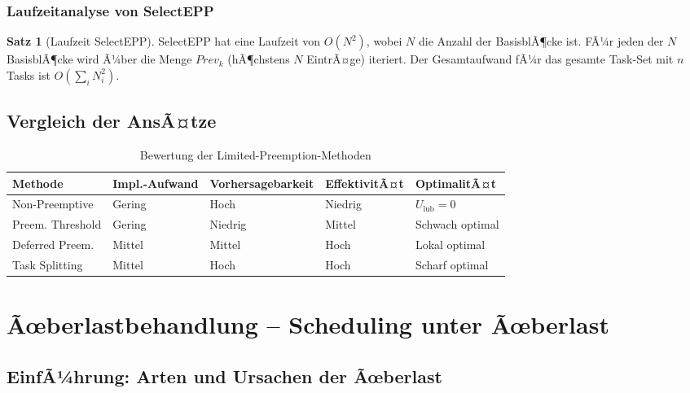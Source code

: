 ﻿\documentclass[a4paper,12pt]{report}
\theoremstyle{definition}
\newtheorem{satz}{Satz}[chapter]
\begin{document}
\subsection{Laufzeitanalyse von SelectEPP}

\begin{satz}[Laufzeit SelectEPP]
	SelectEPP hat eine Laufzeit von $O(N^2)$, wobei $N$ die Anzahl der BasisblÃ¶cke
	ist. FÃ¼r jeden der $N$ BasisblÃ¶cke wird Ã¼ber die Menge $\mathit{Prev}_k$ (hÃ¶chstens
	$N$ EintrÃ¤ge) iteriert. Der Gesamtaufwand fÃ¼r das gesamte Task-Set mit $n$
	Tasks ist $O(\sum_i N_i^2)$.
\end{satz}

\section{Vergleich der AnsÃ¤tze}

\begin{table}[H]
	\centering
	\caption{Bewertung der Limited-Preemption-Methoden}
	\begin{tabular}{p{3cm}p{2cm}p{2.5cm}p{2.5cm}p{2.5cm}}
		\toprule
		\textbf{Methode} & \textbf{Impl.-Aufwand} & \textbf{Vorhersage\-barkeit} & \textbf{EffektivitÃ¤t} & \textbf{OptimalitÃ¤t} \\
		\midrule
		Non-Preemptive  & Gering   & Hoch    & Niedrig  & $U_{\text{lub}} = 0$ \\
		Preem. Threshold & Gering  & Niedrig & Mittel   & Schwach optimal \\
		Deferred Preem. & Mittel   & Mittel  & Hoch     & Lokal optimal \\
		Task Splitting   & Mittel  & Hoch    & Hoch     & Scharf optimal \\
		\bottomrule
	\end{tabular}
\end{table}

\chapter{Ãœberlastbehandlung -- Scheduling unter Ãœberlast}
\label{chap:uberlast}

\section{EinfÃ¼hrung: Arten und Ursachen der Ãœberlast}
\end{document}
